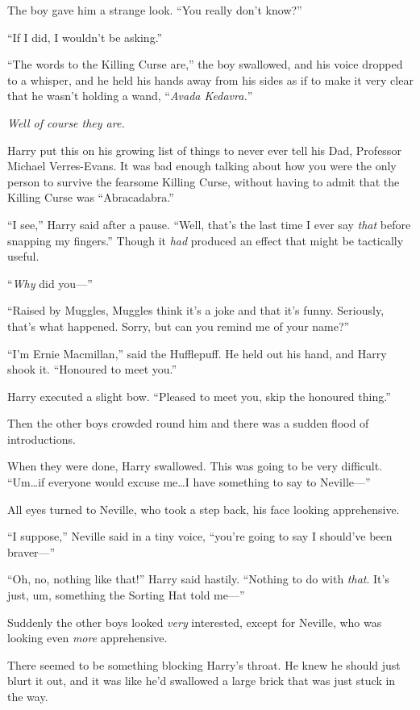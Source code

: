 The boy gave him a strange look. “You really don’t know?”

“If I did, I wouldn’t be asking.”

“The words to the Killing Curse are,” the boy swallowed, and his voice dropped to a whisper, and he held his hands away from his sides as if to make it very clear that he wasn’t holding a wand, “\emph{Avada Kedavra.}”

\emph{Well of course they are.}

Harry put this on his growing list of things to never ever tell his Dad, Professor Michael Verres-Evans. It was bad enough talking about how you were the only person to survive the fearsome Killing Curse, without having to admit that the Killing Curse was “Abracadabra.”

“I see,” Harry said after a pause. “Well, that’s the last time I ever say \emph{that} before snapping my fingers.” Though it \emph{had} produced an effect that might be tactically useful.

“\emph{Why} did you—”

“Raised by Muggles, Muggles think it’s a joke and that it’s funny. Seriously, that’s what happened. Sorry, but can you remind me of your name?”

“I’m Ernie Macmillan,” said the Hufflepuff. He held out his hand, and Harry shook it. “Honoured to meet you.”

Harry executed a slight bow. “Pleased to meet you, skip the honoured thing.”

Then the other boys crowded round him and there was a sudden flood of introductions.

When they were done, Harry swallowed. This was going to be very difficult. “Um…if everyone would excuse me…I have something to say to Neville—”

All eyes turned to Neville, who took a step back, his face looking apprehensive.

“I suppose,” Neville said in a tiny voice, “you’re going to say I should’ve been braver—”

“Oh, no, nothing like that!” Harry said hastily. “Nothing to do with \emph{that}. It’s just, um, something the Sorting Hat told me—”

Suddenly the other boys looked \emph{very} interested, except for Neville, who was looking even \emph{more} apprehensive.

There seemed to be something blocking Harry’s throat. He knew he should just blurt it out, and it was like he’d swallowed a large brick that was just stuck in the way.

